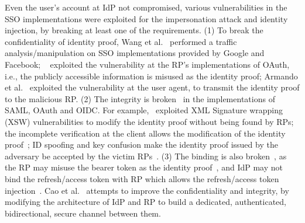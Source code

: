 Even the user's account at IdP not compromised, various vulnerabilities in the SSO implementations were exploited for the impersonation attack and identity injection, by
 breaking at least one of the requirements. %
(1) To break the confidentiality of identity proof,  Wang et al.~\cite{WangCW12} performed a traffic analysis/manipulation on SSO implementations provided by Google and Facebook; ~\cite{ZhouE14,WangZLG16,YangLLZH16} exploited the vulnerability at the RP's implementations of OAuth, i.e., the publicly accessible information is misused as the identity proof;
Armando et al.~\cite{ArmandoCCCPS13} exploited the vulnerability at the user agent, to transmit the identity proof to the malicious RP.
(2) The integrity is broken~\cite{SomorovskyMSKJ12,WangCW12,ZhouE14,WangZLG16,YangLLZH16,MainkaMS16, MainkaMSW17} in the implementations of  SAML, OAuth and OIDC.
For example,~\cite{SomorovskyMSKJ12} exploited XML Signature wrapping (XSW) vulnerabilities to modify the identity proof without being found by RPs;
the incomplete verification at the client allows the modification of the identity proof~\cite{ZhouE14,WangZLG16,YangLLZH16};
ID spoofing and key confusion make the identity proof issued by the adversary be accepted by the victim RPs~\cite{MainkaMS16, MainkaMSW17}.
(3) The binding is also broken~\cite{ZhouE14,WangZLG16,YangLLZH16,YangLCZ18}, as the RP may misuse the bearer token  as the identity proof~\cite{ZhouE14,WangZLG16,YangLLZH16}, and IdP may not bind the refresh/access token with RP which allows the refresh/access token injection~\cite{YangLCZ18}.
Cao et al.~\cite{CaoSBKVC14} attempts to improve the confidentiality and integrity, by modifying the architecture of IdP and RP to
 build a dedicated, authenticated, bidirectional, secure channel between them.


